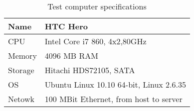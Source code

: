 \begin{table}
  \centering
  \caption{Test computer specifications}
  \begin{tabular}{ | l | l |}
    \hline
    Name    & HTC Hero                          \\ \hline
    CPU     & Intel Core i7 860, 4x2,80GHz        \\ \hline
    Memory  & 4096 MB \ac{RAM}                   \\ \hline
    Storage & Hitachi HDS72105, SATA          \\ \hline
    \ac{OS} & Ubuntu Linux 10.10 64-bit, Linux 2.6.35 \\ \hline
    Netowk  & 100 MBit Ethernet, from host to server \\ \hline
  \end{tabular}
  \label{tbl:device:computer}
\end{table}
